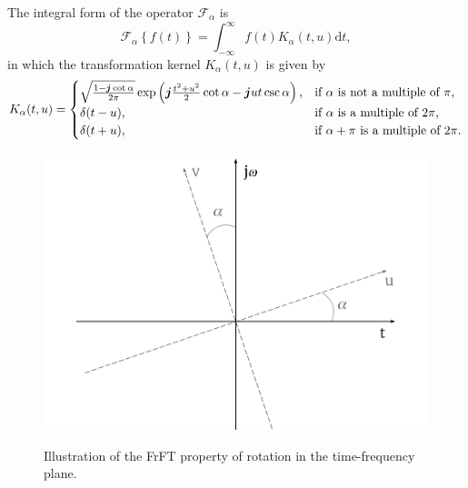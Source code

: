 The integral form of the operator $\mathcal{F}_\alpha$ is
\begin{equation}
\label{eq:integralfrft}
\mathcal{F}_\alpha \left\{ f(t) \right\} = \int_{-\infty}^{\infty} f(t) K_\alpha (t, u) \mathrm{d}t,
\end{equation}
in which the transformation kernel $K_\alpha (t, u)$ is given by
\begin{equation}
K_\alpha (t, u) = 
\begin{cases}
\sqrt{\frac{1 - \boldsymbol{j} \cot \alpha}{2\pi}} \exp \left( \boldsymbol{j} \frac{t^2 + u^2}{2} \cot \alpha - \boldsymbol{j} ut \csc \alpha\right), &
\text{if $\alpha$ is not a multiple of $\pi$,} \\
\delta (t - u), & \text{if $\alpha$ is a multiple of $2\pi$,} \\
\delta (t + u), & \text{if $\alpha + \pi$ is a multiple of $2\pi$.}
\end{cases}
\end{equation}

\begin{figure}
\centering
\caption{Illustration of the FrFT property of rotation in the time-frequency plane.}
\includegraphics[width=0.65\linewidth]{Figures/FrFT-Rotation-cropped.pdf}
\label{fig:frft_rotation}
\end{figure}

